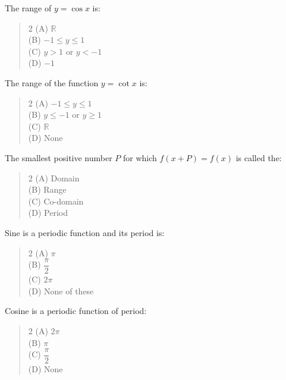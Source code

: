 \documentclass[11pt,a4paper]{article}
\begin{document}
\begin{mcqlist}
\item The range of $y=\cos x$ is:
\begin{quote}\begin{multicols}{2}
\noindent (A) $\mathbb{R}$ \\
(B) $-1\leq y\leq1$ \\
(C) $y>1$ or $y<-1$ \\
(D) $-1$
\end{multicols}\end{quote}

\item The range of the function $y=\cot x$ is:
\begin{quote}\begin{multicols}{2}
\noindent (A) $-1\leq y\leq1$ \\
(B) $y\leq-1$ or $y\geq1$ \\
(C) $\mathbb{R}$ \\
(D) None
\end{multicols}\end{quote}

\item The smallest positive number $P$ for which $f(x+P)=f(x)$ is called the:
\begin{quote}\begin{multicols}{2}
\noindent (A) Domain \\
(B) Range \\
(C) Co-domain \\
(D) Period
\end{multicols}\end{quote}

\item Sine is a periodic function and its period is:
\begin{quote}\begin{multicols}{2}
\noindent (A) $\pi$ \\
(B) $\dfrac{\pi}{2}$ \\
(C) $2\pi$ \\
(D) None of these
\end{multicols}\end{quote}

\item Cosine is a periodic function of period:
\begin{quote}\begin{multicols}{2}
\noindent (A) $2\pi$ \\
(B) $\pi$ \\
(C) $\dfrac{\pi}{2}$ \\
(D) None
\end{multicols}\end{quote}


\end{mcqlist}
\end{document}
